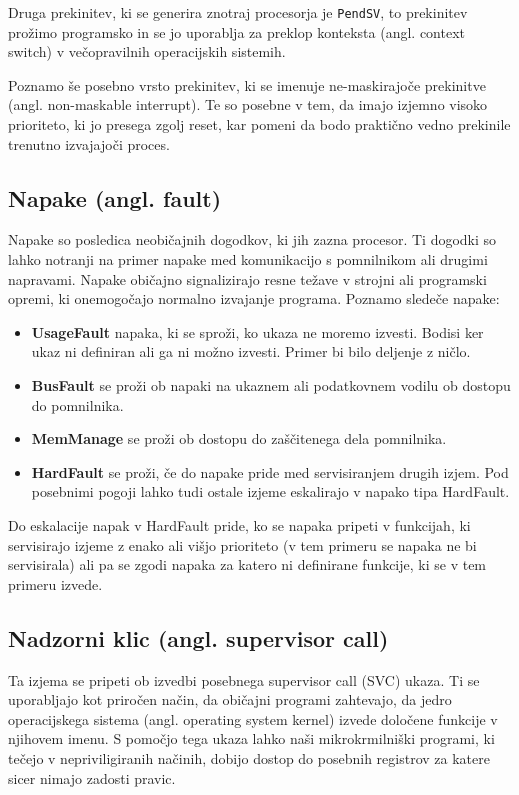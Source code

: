 \documentclass[12pt,letterpaper]{article}
\begin{document}
Druga prekinitev, ki se generira znotraj procesorja je \texttt{PendSV}, to prekinitev prožimo programsko in se jo uporablja za preklop konteksta (angl. context switch) v večopravilnih operacijskih sistemih.

Poznamo še posebno vrsto prekinitev, ki se imenuje ne-maskirajoče prekinitve (angl. non-maskable interrupt). Te so posebne v tem, da imajo izjemno visoko prioriteto, ki jo presega zgolj reset, kar pomeni da bodo praktično vedno prekinile trenutno izvajajoči proces.

\subsection*{Napake (angl. fault)}

Napake so posledica neobičajnih dogodkov, ki jih zazna procesor. Ti dogodki so lahko notranji na primer napake med komunikacijo s pomnilnikom ali drugimi napravami. Napake običajno signalizirajo resne težave v strojni ali programski opremi, ki onemogočajo normalno izvajanje programa. Poznamo sledeče napake:

\begin{itemize}
    \item \textbf{UsageFault} napaka, ki se sproži, ko ukaza ne moremo izvesti. Bodisi ker ukaz ni definiran ali ga ni možno izvesti. Primer bi bilo deljenje z ničlo.
    \item \textbf{BusFault} se proži ob napaki na ukaznem ali podatkovnem vodilu ob dostopu do pomnilnika.
    \item \textbf{MemManage} se proži ob dostopu do zaščitenega dela pomnilnika.
    \item \textbf{HardFault} se proži, če do napake pride med servisiranjem drugih izjem. Pod posebnimi pogoji lahko tudi ostale izjeme eskalirajo v napako tipa HardFault.
\end{itemize}

Do eskalacije napak v HardFault pride, ko se napaka pripeti v funkcijah, ki servisirajo izjeme z enako ali višjo prioriteto (v tem primeru se napaka ne bi servisirala) ali pa se zgodi napaka za katero ni definirane funkcije, ki se v tem primeru izvede.

\subsection*{Nadzorni klic (angl. supervisor call)}

Ta izjema se pripeti ob izvedbi posebnega supervisor call (SVC) ukaza. Ti se uporabljajo kot priročen način, da običajni programi zahtevajo, da jedro operacijskega sistema (angl. operating system kernel) izvede določene funkcije v njihovem imenu. S pomočjo tega ukaza lahko naši mikrokrmilniški programi, ki tečejo v nepriviligiranih načinih, dobijo dostop do posebnih registrov za katere sicer nimajo zadosti pravic.
\end{document}
